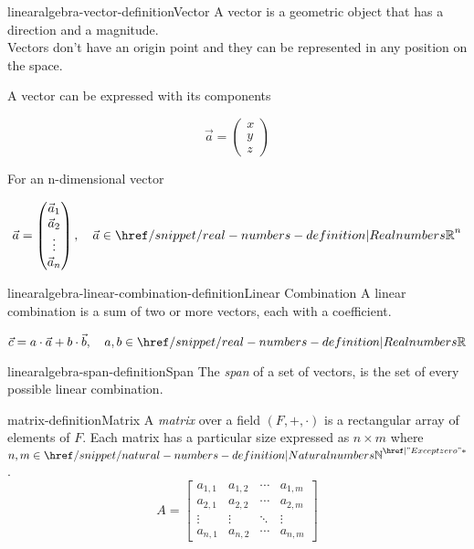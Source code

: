 \documentclass[preview]{standalone}
\begin{document}

\begin{snippetdefinition}{linearalgebra-vector-definition}{Vector}
    A vector is a geometric object that has a direction and a magnitude. \\
    Vectors don't have an origin point and they can be represented in any position on the space.

    A vector can be expressed with its components

    \[
        \vec{a} =
        \begin{pmatrix}
            x \\
            y \\
            z
        \end{pmatrix}
    \]

    For an n-dimensional vector

    \[
        \vec{a} =
        \begin{pmatrix}
            \vec{a}_1 \\
            \vec{a}_2 \\
            \vdots \\
            \vec{a}_n
        \end{pmatrix},
        \quad \vec{a} \in {\realnumbers}^n
    \]
\end{snippetdefinition}

\begin{snippetdefinition}{linearalgebra-linear-combination-definition}{Linear Combination}
    A linear combination is a sum of two or more vectors, each with a coefficient.

    \[
        \vec{c} = a \cdot\vec{a} + b\cdot\vec{b},
        \quad a,b\in \realnumbers
    \]
\end{snippetdefinition}

\begin{snippetdefinition}{linearalgebra-span-definition}{Span}
    The \textit{span} of a set of vectors, is the set of every possible linear combination.
\end{snippetdefinition}

\begin{snippetdefinition}{matrix-definition}{Matrix}
    A \textit{matrix} \function over a field \((F, +, \cdot)\) is a rectangular array of elements of \(F\).
    Each matrix has a particular size expressed as \(n \times m\) where \(n,m\in {\naturalnumbers}^\exceptzero\).
    \[
    A = \begin{bmatrix} 
            a_{1,1} & a_{1,2} & \cdots & a_{1,m} \\
            a_{2,1} & a_{2,2} & \cdots & a_{2,m} \\
            \vdots  & \vdots  & \ddots & \vdots  \\
            a_{n,1} & a_{n,2} & \cdots & a_{n,m} 
        \end{bmatrix}
    \]
\end{snippetdefinition}
\end{document}
